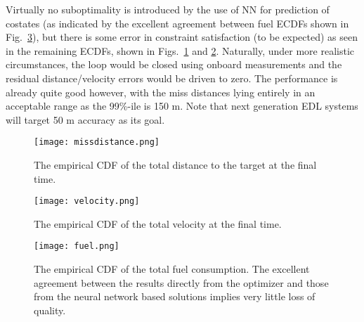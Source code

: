\documentclass[10pt,a4paper]{article}
\begin{document}
Virtually no suboptimality is introduced by the use of NN for prediction of costates (as indicated by the excellent agreement between fuel ECDFs shown in Fig.~\ref{graph_fuel}), but there is some error in constraint satisfaction (to be expected) as seen in the remaining ECDFs, shown in Figs.~\ref{graph_miss} and \ref{graph_vel}. Naturally, under more realistic circumstances, the loop would be closed using onboard measurements and the residual distance/velocity errors would be driven to zero. The performance is already quite good however, with the miss distances lying entirely in an acceptable range as the 99\%-ile is 150 m. Note that next generation EDL systems will target  50 m accuracy as its goal.
\begin{figure}
\caption{The empirical CDF of the total distance to the target at the final time.}
\begin{center}
\texttt{[image: missdistance.png]}\label{graph_miss}
\end{center}
\end{figure}

\begin{figure}
\caption{The empirical CDF of the total velocity at the final time.}
\begin{center}
\texttt{[image: velocity.png]} \label{graph_vel}
\end{center}
\end{figure}

	\begin{figure}
	\caption{The empirical CDF of the total fuel consumption. The excellent agreement between the results directly from the optimizer and those from the neural network based solutions implies very little loss of quality.}
	\begin{center}
	\texttt{[image: fuel.png]} \label{graph_fuel}
	\end{center}
	\end{figure}
	
\end{document}
